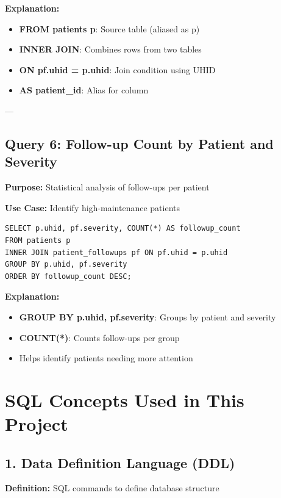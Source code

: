 \documentclass[12pt,a4paper]{article}
\begin{document}
\textbf{Explanation:}
\begin{itemize}
    \item \textbf{FROM patients p}: Source table (aliased as p)
    \item \textbf{INNER JOIN}: Combines rows from two tables
    \item \textbf{ON pf.uhid = p.uhid}: Join condition using UHID
    \item \textbf{AS patient\_id}: Alias for column
\end{itemize}

---

\subsection{Query 6: Follow-up Count by Patient and Severity}

\textbf{Purpose:} Statistical analysis of follow-ups per patient

\textbf{Use Case:} Identify high-maintenance patients

\begin{lstlisting}[caption={Followup Count Analysis}]
SELECT p.uhid, pf.severity, COUNT(*) AS followup_count
FROM patients p
INNER JOIN patient_followups pf ON pf.uhid = p.uhid
GROUP BY p.uhid, pf.severity
ORDER BY followup_count DESC;
\end{lstlisting}

\textbf{Explanation:}
\begin{itemize}
    \item \textbf{GROUP BY p.uhid, pf.severity}: Groups by patient and severity
    \item \textbf{COUNT(*)}: Counts follow-ups per group
    \item Helps identify patients needing more attention
\end{itemize}

\section{SQL Concepts Used in This Project}

\subsection{1. Data Definition Language (DDL)}

\textbf{Definition:} SQL commands to define database structure
\end{document}
